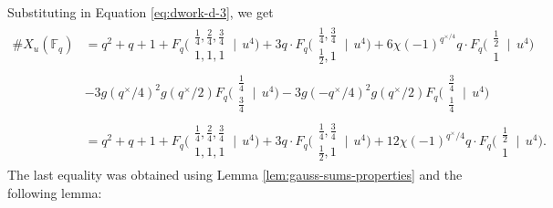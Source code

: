 \documentclass[11pt, reqno]{amsart}
\theoremstyle{plain}
\theoremstyle{definition}
\newcommand{\F}{\mathbb{F}}
\begin{document}
    Substituting in Equation \eqref{eq:dwork-d-3}, we get 
    \begin{align*}
    \#X_u(\F_q)  &= q^2+q+1 + F_q\biggl(\begin{matrix} \frac{1}{4}, \frac{2}{4}, \frac{3}{4} \\ 1,  1, 1 \end{matrix} \:\bigg|\:\: u^{4} \biggr)+3 q \cdot  F_q\biggl(\begin{matrix} \frac{1}{4},  \frac{3}{4} \\ \frac{1}{2},  1 \end{matrix} \:\bigg|\:\: u^{4} \biggr)+6\chi(-1)^{q^{\times/4}} q \cdot F_q\biggl(\begin{matrix} \frac{1}{2} \\ 1 \end{matrix} \:\bigg|\:\: u^{4} \biggr)\\
     &-3g\left(q^\times/4\right)^2 g\left(q^\times/2\right)F_q\biggl(\begin{matrix} \frac{1}{4} \\ \frac{3}{4} \end{matrix} \:\bigg|\:\: u^{4} \biggr)-3g\left(-q^\times/4\right)^2   g\left(q^\times/2\right)F_q\biggl(\begin{matrix} \frac{3}{4} \\ \frac{1}{4} \end{matrix} \:\bigg|\:\: u^{4} \biggr)\\
     &= q^2+q+1 + F_q\biggl(\begin{matrix} \frac{1}{4}, \frac{2}{4}, \frac{3}{4} \\ 1,  1, 1 \end{matrix} \:\bigg|\:\: u^{4} \biggr)+ 3q \cdot F_q\biggl(\begin{matrix} \frac{1}{4},  \frac{3}{4} \\ \frac{1}{2},  1 \end{matrix} \:\bigg|\:\: u^{4} \biggr) +12\chi(-1)^{q^{\times}/4} q\cdot  F_q\biggl(\begin{matrix} \frac{1}{2} \\ 1 \end{matrix} \:\bigg|\:\: u^{4} \biggr).
    \end{align*}
The last equality was obtained using Lemma \ref{lem:gauss-sums-properties} and the following lemma:
\end{document}
